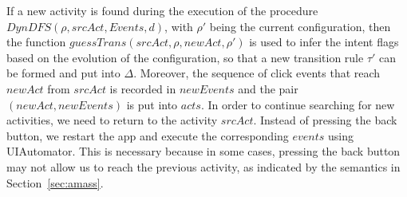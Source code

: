\begin{algorithm}[htbp]
  \SetAlgoLined
\;
    \caption{$DynDFS(\rho, srcAct, events, d)$}
    \label{alg-dyndfs}
\end{algorithm}


If a new activity is found during the execution of the procedure $DynDFS(\rho, srcAct, Events, d)$, with $\rho'$ being the current configuration, then the function $guessTrans(srcAct, \rho, newAct, \rho')$ is used to infer the intent flags based on the evolution of the configuration, so that a new transition rule $\tau'$ can be formed and put into $\Delta$. Moreover, the sequence of click events that reach $newAct$ from $srcAct$ is recorded in $newEvents$ and the pair $(newAct, newEvents)$ is put into $acts$.  
In order to continue searching for new activities, we need to return to the activity $srcAct$. Instead of pressing the back button, we restart the app and execute the corresponding $events$ using UIAutomator. This is necessary because in some cases, pressing the back button may not allow us to reach the previous activity, as indicated by the semantics in Section~\ref{sec:amass}.


